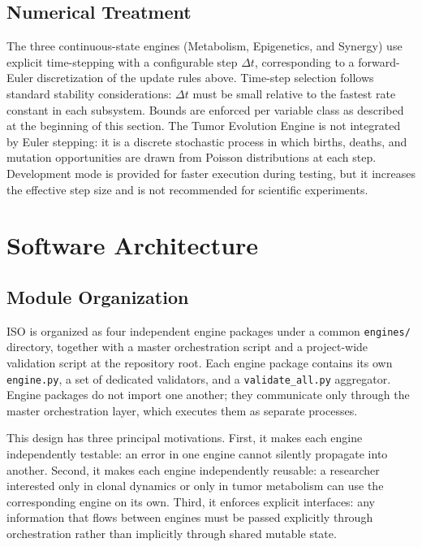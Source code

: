\documentclass[12pt,a4paper]{article}
\begin{document}
\subsection{Numerical Treatment}

The three continuous-state engines (Metabolism, Epigenetics, and Synergy) use explicit time-stepping with a configurable step $\Delta t$, corresponding to a forward-Euler discretization of the update rules above. Time-step selection follows standard stability considerations: $\Delta t$ must be small relative to the fastest rate constant in each subsystem. Bounds are enforced per variable class as described at the beginning of this section. The Tumor Evolution Engine is not integrated by Euler stepping: it is a discrete stochastic process in which births, deaths, and mutation opportunities are drawn from Poisson distributions at each step. Development mode is provided for faster execution during testing, but it increases the effective step size and is not recommended for scientific experiments.

\section{Software Architecture}
\label{sec:architecture}

\subsection{Module Organization}

ISO is organized as four independent engine packages under a common \texttt{engines/} directory, together with a master orchestration script and a project-wide validation script at the repository root. Each engine package contains its own \texttt{engine.py}, a set of dedicated validators, and a \texttt{validate\_all.py} aggregator. Engine packages do not import one another; they communicate only through the master orchestration layer, which executes them as separate processes.

This design has three principal motivations. First, it makes each engine independently testable: an error in one engine cannot silently propagate into another. Second, it makes each engine independently reusable: a researcher interested only in clonal dynamics or only in tumor metabolism can use the corresponding engine on its own. Third, it enforces explicit interfaces: any information that flows between engines must be passed explicitly through orchestration rather than implicitly through shared mutable state.
\end{document}
